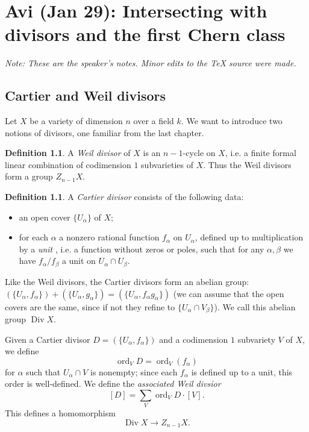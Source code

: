 \documentclass[leqno, openany]{memoir}
\theoremstyle{definition}
\newtheorem{defn}[thm]{Definition}
\theoremstyle{remark}
\theoremstyle{plain}
\theoremstyle{definition}
\theoremstyle{remark}
\DeclareMathOperator{\ord}{ord}
\DeclareMathOperator{\Div}{Div}
\begin{document}
\chapter{Avi (Jan 29): Intersecting with divisors and the first Chern class}%
\label{cha:avi_jan_29_intersecting_with_divisors_and_the_first_chern_class}

\textit{Note: These are the speaker's notes. Minor edits to the {\TeX} source
were made.} 

\section{Cartier and Weil divisors} Let $X$ be a variety of dimension $n$ over
a field $k$. We want to introduce two notions of divisors, one familiar from
the last chapter.

\begin{defn} A \textit{Weil divisor} of $X$ is an $n-1$-cycle on $X$, i.e. a
finite formal linear combination of codimension $1$ subvarieties of $X$. Thus
the Weil divisors form a group $Z_{n-1} X$.  \end{defn}

\begin{defn} A \textit{Cartier divisor}  consists of the following data:
    \begin{itemize} \item an open cover $\{U_\alpha\}$ of $X$; \item for each
        $\alpha$ a nonzero rational function $f_\alpha$ on $U_\alpha$, defined
        up to multiplication by a \textit{unit} , i.e. a function without zeros
        or poles, such that for any $\alpha, \beta$ we have $f_\alpha/f_\beta$
        a unit on $U_\alpha \cap U_\beta$.  \end{itemize} \end{defn}

Like the Weil divisors, the Cartier divisors form an abelian group:
$(\{U_\alpha, f_\alpha\}) + (\{U_\alpha, g_\alpha\}) = (\{U_\alpha, f_\alpha
g_\alpha\})$ (we can assume that the open covers are the same, since if not
they refine to $\{U_\alpha \cap V_\beta\}$). We call this abelian group $\Div
X$.

Given a Cartier divisor $D = (\{U_\alpha, f_\alpha\})$ and a codimension $1$
subvariety $V$ of $X$, we define \[ \ord_V D = \ord_V (f_\alpha) \] for
$\alpha$ such that $U_\alpha \cap V$ is nonempty; since each $f_\alpha$ is
defined up to a unit, this order is well-defined. We define the
\textit{associated Weil divsior} \[ [D] = \sum_V \ord_V D \cdot [V]. \] This
defines a homomorphism \[ \Div X \to Z_{n-1} X. \]
\end{document}
